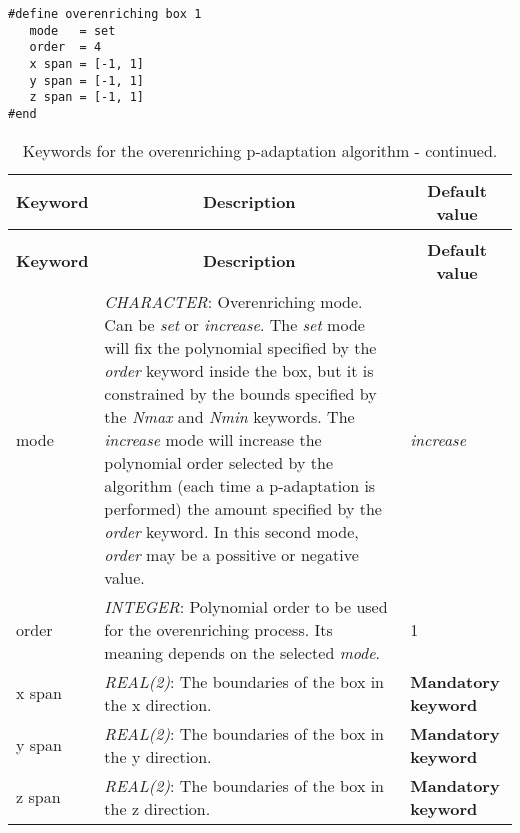 \documentclass[a4paper,10pt]{report}
\begin{document}
\begin{lstlisting}
#define overenriching box 1
   mode   = set
   order  = 4
   x span = [-1, 1]
   y span = [-1, 1]
   z span = [-1, 1]
#end
\end{lstlisting}

\begin{longtable}{|p{4cm}|p{10cm}|p{2.2cm}|}
\caption{Keywords for the overenriching p-adaptation algorithm.} \label{tab:RLpAdaptationKey} \\
\hline
\multicolumn{1}{|c|}{\textbf{Keyword}} & \multicolumn{1}{c|}{\textbf{Description}} & \multicolumn{1}{c|}{\textbf{Default value}} \\ \hline
\endfirsthead

\caption{Keywords for the overenriching p-adaptation algorithm - continued.} \\
\hline
\multicolumn{1}{|c|}{\textbf{Keyword}} & \multicolumn{1}{c|}{\textbf{Description}} & \multicolumn{1}{c|}{\textbf{Default value}} \\ \hline
\endhead

mode & \textit{CHARACTER}: Overenriching mode. Can be \textit{set} or \textit{increase}. The \textit{set} mode will fix the polynomial specified by the \textit{order} keyword inside the box, but it is constrained by the bounds specified by the \textit{Nmax} and \textit{Nmin} keywords. The \textit{increase} mode will increase the polynomial order selected by the algorithm (each time a p-adaptation is performed) the amount specified by the \textit{order} keyword. In this second mode, \textit{order} may be a possitive or negative value. & \textit{increase} \\ \hline

order & \textit{INTEGER}: Polynomial order to be used for the overenriching process. Its meaning depends on the selected \textit{mode}. & 1 \\ \hline

x span & \textit{REAL(2)}: The boundaries of the box in the x direction. & \textbf{Mandatory keyword} \\ \hline

y span & \textit{REAL(2)}: The boundaries of the box in the y direction. & \textbf{Mandatory keyword} \\ \hline

z span & \textit{REAL(2)}: The boundaries of the box in the z direction. & \textbf{Mandatory keyword} \\ \hline


\end{longtable}
\end{document}
